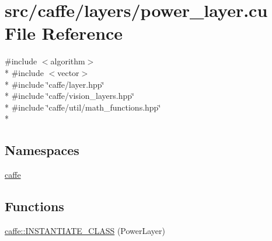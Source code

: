 \hypertarget{power__layer_8cu}{\section{src/caffe/layers/power\+\_\+layer.cu File Reference}
\label{power__layer_8cu}
}
{\ttfamily \#include $<$algorithm$>$}\\*
{\ttfamily \#include $<$vector$>$}\\*
{\ttfamily \#include \char`\"{}caffe/layer.\+hpp\char`\"{}}\\*
{\ttfamily \#include \char`\"{}caffe/vision\+\_\+layers.\+hpp\char`\"{}}\\*
{\ttfamily \#include \char`\"{}caffe/util/math\+\_\+functions.\+hpp\char`\"{}}\\*
\subsection*{Namespaces}
\begin{DoxyCompactItemize}
\item 
 \hyperlink{namespacecaffe}{caffe}
\end{DoxyCompactItemize}
\subsection*{Functions}
\begin{DoxyCompactItemize}
\item 
\hyperlink{namespacecaffe_afc43e6d359620a8c571275f7d75c6a4c}{caffe\+::\+I\+N\+S\+T\+A\+N\+T\+I\+A\+T\+E\+\_\+\+C\+L\+A\+S\+S} (Power\+Layer)
\end{DoxyCompactItemize}
